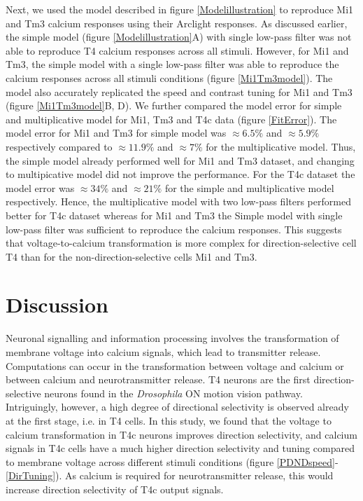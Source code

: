 \documentclass[9pt,lineno]{elife}
\begin{document}
Next, we used the model described in figure \ref{Modelillustration} to reproduce Mi1 and Tm3 calcium responses using their Arclight responses. As discussed earlier, the simple model (figure \ref{Modelillustration}A) with single low-pass filter was not able to reproduce T4 calcium responses across all stimuli. However, for Mi1 and Tm3, the simple model with a single low-pass filter was able to reproduce the calcium responses across all stimuli conditions (figure \ref{Mi1Tm3model}). The model also accurately replicated the speed and contrast tuning for Mi1 and Tm3 (figure \ref{Mi1Tm3model}B, D). We further compared the model error for simple and multiplicative model for Mi1, Tm3 and T4c data (figure \ref{FitError}). The model error for Mi1 and Tm3 for simple model was $\approx6.5\%$ and $\approx5.9\%$ respectively compared to $\approx11.9\%$ and $\approx7\%$ for the multiplicative model. Thus, the simple model already performed well for Mi1 and Tm3 dataset, and changing to multipicative model did not improve the performance. For the T4c dataset the model error was $\approx34\%$ and  $\approx21\%$ for the simple and multiplicative model respectively. Hence, the multiplicative model with two low-pass filters performed better for T4c dataset whereas for Mi1 and Tm3 the Simple model with single low-pass filter was sufficient to reproduce the calcium responses. This suggests that voltage-to-calcium transformation is more complex for direction-selective cell T4 than for the non-direction-selective cells Mi1 and Tm3.

\section{Discussion}
Neuronal signalling and information processing involves the transformation of membrane voltage into calcium signals, which lead to transmitter release. Computations can occur in the transformation between voltage and calcium or between calcium and neurotransmitter release. T4 neurons are the first direction-selective neurons found in the \textit{Drosophila} ON motion vision pathway. Intriguingly, however, a high degree of directional selectivity is observed already at the first stage, i.e. in T4 cells. In this study, we found that the voltage to calcium transformation in T4c neurons improves direction selectivity, and calcium signals in T4c cells have a much higher direction selectivity and tuning compared to membrane voltage across different stimuli conditions (figure \ref{PDNDspeed}-\ref{DirTuning}). As calcium is required for neurotransmitter release, this would increase direction selectivity of T4c output signals. 
\end{document}
